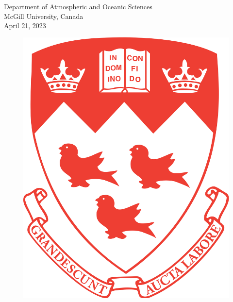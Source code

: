 \documentclass[12pt]{article}
\begin{document}
\begin{titlepage}
\begin{center}
       {\fontsize{12}{14}\selectfont Department of Atmospheric and Oceanic Sciences\\
       McGill University, Canada\\
       April 21, 2023}\\
       \begin{figure}[htp]
            \centering
            \begin{adjustbox}{frame=1pt 10pt 1pt 15pt,clip,margin=0.1cm}
                \includegraphics[scale=0.04]{McGill_University_CoA.svg.png}
            \end{adjustbox}
       \end{figure}
            
   \end{center}
\end{titlepage}

\tableofcontents




\newpage
\end{document}
